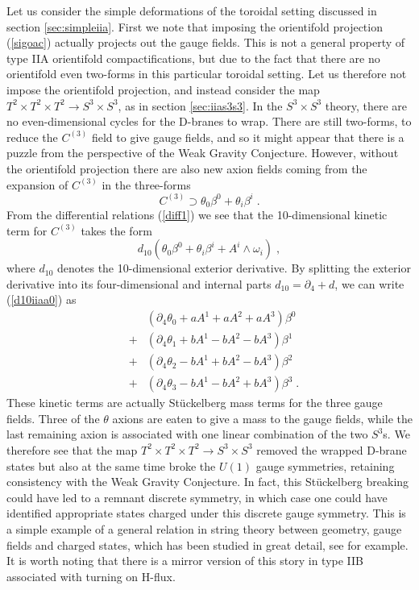 \documentclass[11pt,a4paper]{article}
\numberwithin{equation}{section}
\numberwithin{table}{section}\setlength{\multlinegap}{25pt}
\newcommand{\bea}{\begin{eqnarray}}  \newcommand{\eea}{\end{eqnarray}}
\newcommand{\nn}{\nonumber}
\newcommand{\be}{\begin{equation}}
\newcommand{\ee}{\end{equation}}
\begin{document}
Let us consider the simple deformations of the toroidal setting discussed in section \ref{sec:simpleiia}. First we note that imposing the orientifold projection (\ref{sigoac}) actually projects out the gauge fields. This is not a general property of type IIA orientifold compactifications, but due to the fact that there are no orientifold even two-forms in this particular toroidal setting. Let us therefore not impose the orientifold projection, and instead consider the map $T^2 \times T^2 \times T^2 \rightarrow S^3 \times S^3$, as in section \ref{sec:iias3s3}. In the $S^3 \times S^3$ theory, there are no even-dimensional cycles for the D-branes to wrap. There are still two-forms, to reduce the $C^{(3)}$ field to give gauge fields, and so it might appear that there is a puzzle from the perspective of the Weak Gravity Conjecture. However, without the orientifold projection there are also new axion fields coming from the expansion of $C^{(3)}$ in the three-forms
\be
C^{(3)} \supset \theta_0 \beta^0 + \theta_i \beta^i  \;.
\ee
From the differential relations (\ref{diff1}) we see that the 10-dimensional kinetic term for $C^{(3)}$ takes the form
\be
d_{10} \left( \theta_0 \beta^0 + \theta_i \beta^i  + A^i \wedge \omega_i \right) \;, 
\label{d10iiaa0}
\ee
where $d_{10}$ denotes the 10-dimensional exterior derivative. By splitting the exterior derivative into its four-dimensional and internal parts $d_{10}= \partial_4 + d$, we can write (\ref{d10iiaa0}) as
\bea
& &\left(\partial_4 \theta_0 + a A^1 + a A^2 + a A^3 \right) \beta^0 \; \nn \\
&+& \left(\partial_4 \theta_1 + b A^1 - b A^2 - b A^3 \right) \beta^1 \; \nn \\ 
&+& \left(\partial_4 \theta_2 - b A^1 + b A^2 - b A^3 \right) \beta^2 \; \nn \\
&+& \left(\partial_4 \theta_3 - b A^1 - b A^2 + b A^3 \right) \beta^3 \;.    
\eea
These kinetic terms are actually St\"uckelberg mass terms for the three gauge fields. Three of the $\theta$ axions are eaten to give a mass to the gauge fields, while the last remaining axion is associated with one linear combination of the two $S^3$s. We therefore see that the map $T^2 \times T^2 \times T^2 \rightarrow S^3 \times S^3$ removed the wrapped D-brane states but also at the same time broke the $U(1)$ gauge symmetries, retaining consistency with the Weak Gravity Conjecture. In fact, this St\"uckelberg breaking could have led to a remnant discrete symmetry, in which case one could have identified appropriate states charged under this discrete gauge symmetry. This is a simple example of a general relation in string theory between geometry, gauge fields and charged states, which has been studied in great detail, see \cite{Grimm:2010ez,Camara:2011jg,Grimm:2011tb,BerasaluceGonzalez:2011wy,BerasaluceGonzalez:2012zn,Berasaluce-Gonzalez:2013bba,Mayrhofer:2014haa,Mayrhofer:2014laa,Cvetic:2015moa,Kimura:2016crs} for example. It is worth noting that there is a mirror version of this story in type IIB associated with turning on H-flux. 
\end{document}
